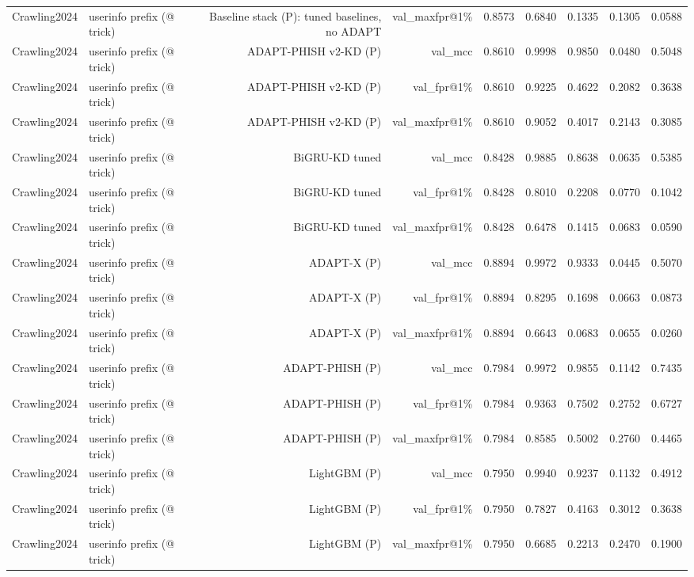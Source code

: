 \begin{table}[t]
\begin{tabular}{llrrrrrrr}
Crawling2024 & userinfo prefix (@ trick) & Baseline stack (P): tuned baselines, no ADAPT & val\_maxfpr@1\% & 0.8573 & 0.6840 & 0.1335 & 0.1305 & 0.0588 \\
Crawling2024 & userinfo prefix (@ trick) & ADAPT-PHISH v2-KD (P) & val\_mcc & 0.8610 & 0.9998 & 0.9850 & 0.0480 & 0.5048 \\
Crawling2024 & userinfo prefix (@ trick) & ADAPT-PHISH v2-KD (P) & val\_fpr@1\% & 0.8610 & 0.9225 & 0.4622 & 0.2082 & 0.3638 \\
Crawling2024 & userinfo prefix (@ trick) & ADAPT-PHISH v2-KD (P) & val\_maxfpr@1\% & 0.8610 & 0.9052 & 0.4017 & 0.2143 & 0.3085 \\
Crawling2024 & userinfo prefix (@ trick) & BiGRU-KD tuned & val\_mcc & 0.8428 & 0.9885 & 0.8638 & 0.0635 & 0.5385 \\
Crawling2024 & userinfo prefix (@ trick) & BiGRU-KD tuned & val\_fpr@1\% & 0.8428 & 0.8010 & 0.2208 & 0.0770 & 0.1042 \\
Crawling2024 & userinfo prefix (@ trick) & BiGRU-KD tuned & val\_maxfpr@1\% & 0.8428 & 0.6478 & 0.1415 & 0.0683 & 0.0590 \\
Crawling2024 & userinfo prefix (@ trick) & ADAPT-X (P) & val\_mcc & 0.8894 & 0.9972 & 0.9333 & 0.0445 & 0.5070 \\
Crawling2024 & userinfo prefix (@ trick) & ADAPT-X (P) & val\_fpr@1\% & 0.8894 & 0.8295 & 0.1698 & 0.0663 & 0.0873 \\
Crawling2024 & userinfo prefix (@ trick) & ADAPT-X (P) & val\_maxfpr@1\% & 0.8894 & 0.6643 & 0.0683 & 0.0655 & 0.0260 \\
Crawling2024 & userinfo prefix (@ trick) & ADAPT-PHISH (P) & val\_mcc & 0.7984 & 0.9972 & 0.9855 & 0.1142 & 0.7435 \\
Crawling2024 & userinfo prefix (@ trick) & ADAPT-PHISH (P) & val\_fpr@1\% & 0.7984 & 0.9363 & 0.7502 & 0.2752 & 0.6727 \\
Crawling2024 & userinfo prefix (@ trick) & ADAPT-PHISH (P) & val\_maxfpr@1\% & 0.7984 & 0.8585 & 0.5002 & 0.2760 & 0.4465 \\
Crawling2024 & userinfo prefix (@ trick) & LightGBM (P) & val\_mcc & 0.7950 & 0.9940 & 0.9237 & 0.1132 & 0.4912 \\
Crawling2024 & userinfo prefix (@ trick) & LightGBM (P) & val\_fpr@1\% & 0.7950 & 0.7827 & 0.4163 & 0.3012 & 0.3638 \\
Crawling2024 & userinfo prefix (@ trick) & LightGBM (P) & val\_maxfpr@1\% & 0.7950 & 0.6685 & 0.2213 & 0.2470 & 0.1900 \\

\end{tabular}
\end{table}
